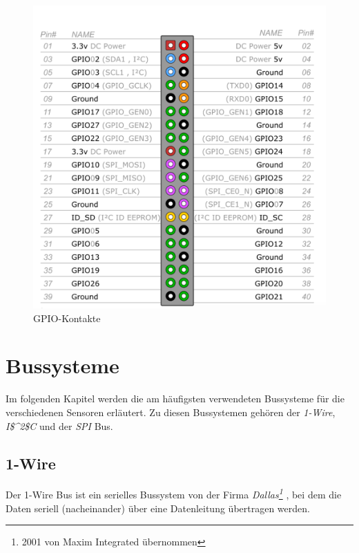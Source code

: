 \begin{figure}[!h] 
  \centering
     \includegraphics[scale=.35]{BilderAllgemein/GPIO.png}
  \caption{GPIO-Kontakte \citep{GPIO_Header_Bild}}
  \label{Abb_Bild_GPIO}
\end{figure}

\section{Bussysteme}
\label{section_Bussysteme}
Im folgenden Kapitel werden die am häufigsten verwendeten Bussysteme für die verschiedenen Sensoren erläutert. Zu diesen Bussystemen gehören der \textit{1-Wire}, \textit{\ac{I$^2$C}} und der \textit{\ac{SPI}} Bus. 

\subsection{1-Wire}
\label{subsection_1Wire}
Der 1-Wire Bus ist ein serielles Bussystem von der Firma \textit{Dallas\footnote{2001 von Maxim Integrated übernommen}} , bei dem die Daten seriell (nacheinander) über eine Datenleitung übertragen werden.
